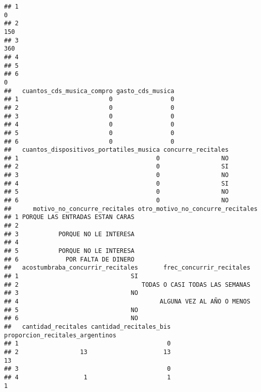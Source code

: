 \documentclass[
]{article}
\begin{document}
\begin{verbatim}
## 1                                                                      0
## 2                                                                    150
## 3                                                                    360
## 4                                                                       
## 5                                                                       
## 6                                                                      0
##   cuantos_cds_musica_compro gasto_cds_musica
## 1                         0                0
## 2                         0                0
## 3                         0                0
## 4                         0                0
## 5                         0                0
## 6                         0                0
##   cuantos_dispositivos_portatiles_musica concurre_recitales
## 1                                      0                 NO
## 2                                      0                 SI
## 3                                      0                 NO
## 4                                      0                 SI
## 5                                      0                 NO
## 6                                      0                 NO
##      motivo_no_concurre_recitales otro_motivo_no_concurre_recitales
## 1 PORQUE LAS ENTRADAS ESTAN CARAS                                  
## 2                                                                  
## 3           PORQUE NO LE INTERESA                                  
## 4                                                                  
## 5           PORQUE NO LE INTERESA                                  
## 6             POR FALTA DE DINERO                                  
##   acostumbraba_concurrir_recitales       frec_concurrir_recitales
## 1                               SI                               
## 2                                  TODAS O CASI TODAS LAS SEMANAS
## 3                               NO                               
## 4                                       ALGUNA VEZ AL AÑO O MENOS
## 5                               NO                               
## 6                               NO                               
##   cantidad_recitales cantidad_recitales_bis proporcion_recitales_argentinos
## 1                                         0                                
## 2                 13                     13                              13
## 3                                         0                                
## 4                  1                      1                               1

\end{verbatim}
\end{document}
